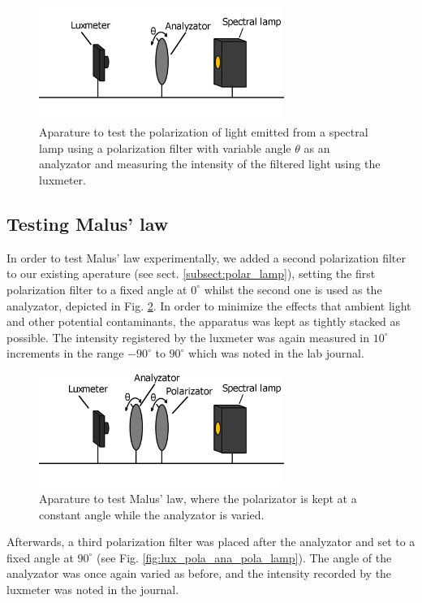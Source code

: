 \documentclass[11pt,a4paper]{article}
\begin{document}
  \begin{figure}[H]
    \center
    \includegraphics[width=8cm]{scripts/figs/diagram_1.png}
    \caption{Aparature to test the polarization of light emitted from a spectral lamp using a polarization filter with variable angle $\theta$ as an analyzator and measuring the intensity of the filtered light using the luxmeter.}
    \label{fig:lux_ana_lamp}
  \end{figure}

  \subsection{Testing Malus' law}

    In order to test Malus' law experimentally, we added a second polarization filter to our existing aperature (see sect. \ref{subsect:polar_lamp}), setting the first polarization filter to a fixed angle at $0^\circ$ whilst the second one is used as the analyzator, depicted in Fig. \ref{fig:lux_ana_pola_lamp}. In order to minimize the effects that ambient light and other potential contaminants, the apparatus was kept as tightly stacked as possible. The intensity registered by the luxmeter was again measured in $10^\circ$ increments in the range $-90^\circ$ to $90^\circ$ which was noted in the lab journal. 

    \begin{figure}[H]
      \center
      \includegraphics[width=8cm]{scripts/figs/diagram_2.png}
      \caption{Aparature to test Malus' law, where the polarizator is kept at a constant angle while the analyzator is varied.}
      \label{fig:lux_ana_pola_lamp}
    \end{figure}

    Afterwards, a third polarization filter was placed after the analyzator and set to a fixed angle at $90^\circ$ (see Fig. \ref{fig:lux_pola_ana_pola_lamp}). The angle of the analyzator was once again varied as before, and the intensity recorded by the luxmeter was noted in the journal.
\end{document}
